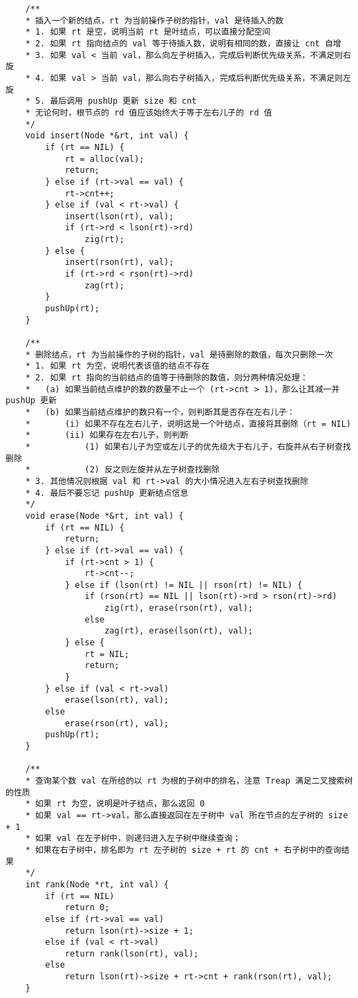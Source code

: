 \begin{verbatim}
    /**
    * 插入一个新的结点，rt 为当前操作子树的指针，val 是待插入的数 
    * 1. 如果 rt 是空，说明当前 rt 是叶结点，可以直接分配空间
    * 2. 如果 rt 指向结点的 val 等于待插入数，说明有相同的数，直接让 cnt 自增 
    * 3. 如果 val < 当前 val，那么向左子树插入，完成后判断优先级关系，不满足则右旋
    * 4. 如果 val > 当前 val，那么向右子树插入，完成后判断优先级关系，不满足则左旋
    * 5. 最后调用 pushUp 更新 size 和 cnt
    * 无论何时，根节点的 rd 值应该始终大于等于左右儿子的 rd 值 
    */
    void insert(Node *&rt, int val) {
        if (rt == NIL) {
            rt = alloc(val);
            return;
        } else if (rt->val == val) {
            rt->cnt++;
        } else if (val < rt->val) {
            insert(lson(rt), val);
            if (rt->rd < lson(rt)->rd)
                zig(rt);
        } else {
            insert(rson(rt), val);
            if (rt->rd < rson(rt)->rd)
                zag(rt);
        }
        pushUp(rt);
    }
    
    /**
    * 删除结点，rt 为当前操作的子树的指针，val 是待删除的数值，每次只删除一次 
    * 1. 如果 rt 为空，说明代表该值的结点不存在 
    * 2. 如果 rt 指向的当前结点的值等于待删除的数值，则分两种情况处理：
    *   (a) 如果当前结点维护的数的数量不止一个 (rt->cnt > 1)，那么让其减一并 pushUp 更新
    *   (b) 如果当前结点维护的数只有一个，则判断其是否存在左右儿子：
    *       (i) 如果不存在左右儿子，说明这是一个叶结点，直接将其删除（rt = NIL)
    *       (ii) 如果存在左右儿子，则判断
    *           (1) 如果右儿子为空或左儿子的优先级大于右儿子，右旋并从右子树查找删除 
    *           (2) 反之则左旋并从左子树查找删除
    * 3. 其他情况则根据 val 和 rt->val 的大小情况进入左右子树查找删除
    * 4. 最后不要忘记 pushUp 更新结点信息 
    */
    void erase(Node *&rt, int val) {
        if (rt == NIL) {
            return;
        } else if (rt->val == val) {
            if (rt->cnt > 1) {
                rt->cnt--;
            } else if (lson(rt) != NIL || rson(rt) != NIL) {
                if (rson(rt) == NIL || lson(rt)->rd > rson(rt)->rd)
                    zig(rt), erase(rson(rt), val);
                else
                    zag(rt), erase(lson(rt), val);
            } else {
                rt = NIL;
                return;
            }
        } else if (val < rt->val)
            erase(lson(rt), val);
        else
            erase(rson(rt), val);
        pushUp(rt);
    }

    /**
    * 查询某个数 val 在所给的以 rt 为根的子树中的排名，注意 Treap 满足二叉搜索树的性质 
    * 如果 rt 为空，说明是叶子结点，那么返回 0
    * 如果 val == rt->val，那么直接返回在左子树中 val 所在节点的左子树的 size + 1 
    * 如果 val 在左子树中，则递归进入左子树中继续查询；
    * 如果在右子树中，排名即为 rt 左子树的 size + rt 的 cnt + 右子树中的查询结果 
    */ 
    int rank(Node *rt, int val) {
        if (rt == NIL)
            return 0;
        else if (rt->val == val)
            return lson(rt)->size + 1;
        else if (val < rt->val)
            return rank(lson(rt), val);
        else
            return lson(rt)->size + rt->cnt + rank(rson(rt), val);
    }
    

\end{verbatim}
